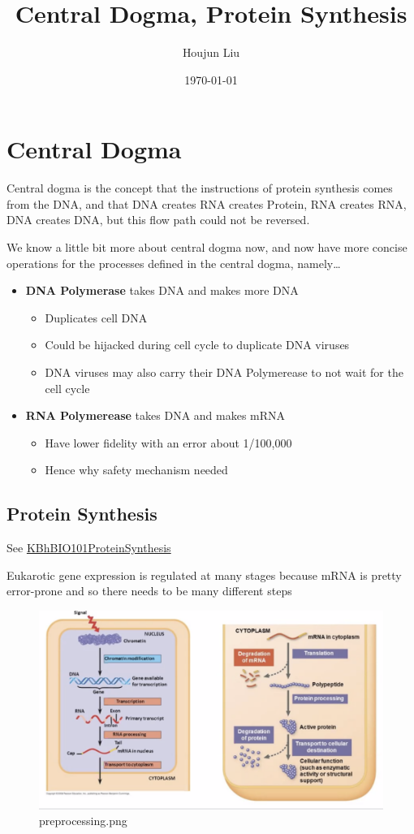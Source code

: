 \documentclass[letterpaper]{article}
\author{Houjun Liu}
\date{\today}
\title{Central Dogma, Protein Synthesis}
\renewcommand{\tableofcontents}{}
\begin{document}
\tableofcontents



\section{Central Dogma}
\label{sec:org09db75a}
Central dogma is the concept that the instructions of protein synthesis
comes from the DNA, and that DNA creates RNA creates Protein, RNA
creates RNA, DNA creates DNA, but this flow path could not be reversed.

We know a little bit more about central dogma now, and now have more
concise operations for the processes defined in the central dogma,
namely\ldots{}

\begin{itemize}
\item \textbf{DNA Polymerase} takes DNA and makes more DNA

\begin{itemize}
\item Duplicates cell DNA
\item Could be hijacked during cell cycle to duplicate DNA viruses
\item DNA viruses may also carry their DNA Polymerease to not wait for the
cell cycle
\end{itemize}

\item \textbf{RNA Polymerease} takes DNA and makes mRNA

\begin{itemize}
\item Have lower fidelity with an error about 1/100,000
\item Hence why safety mechanism needed
\end{itemize}
\end{itemize}

\subsection{Protein Synthesis}
\label{sec:orga5c8154}
See \href{KBhBIO101ProteinSynthesis.org}{KBhBIO101ProteinSynthesis}

Eukarotic gene expression is regulated at many stages because mRNA is
pretty error-prone and so there needs to be many different steps

\begin{figure}[htbp]
\centering
\includegraphics[width=.9\linewidth]{preprocessing.png}
\caption{preprocessing.png}
\end{figure}
\end{document}
